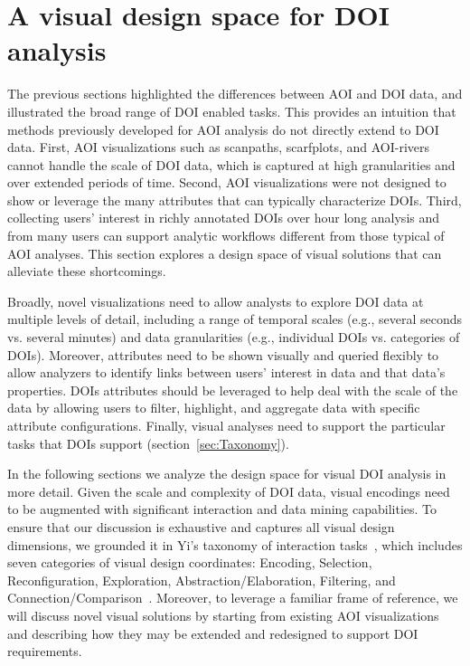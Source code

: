 \section{A visual design space for DOI analysis}
The previous sections highlighted the differences between AOI and DOI data, and illustrated the broad range of DOI enabled tasks. This provides an intuition that methods previously developed for AOI analysis do not directly extend to DOI data. First, AOI visualizations such as scanpaths, scarfplots, and AOI-rivers cannot handle the scale of DOI data, which is captured at high granularities and over extended periods of time. Second, AOI visualizations were not designed to show or leverage the many attributes that can typically characterize DOIs.  Third, collecting users' interest in richly annotated DOIs over hour long analysis and from many users can support analytic workflows different from those typical of AOI analyses. This section explores a design space of visual solutions that can alleviate these shortcomings.

Broadly, novel visualizations need to allow analysts to explore DOI data at multiple levels of detail, including a range of temporal scales (e.g., several seconds vs. several minutes) and data granularities (e.g., individual DOIs vs. categories of DOIs).  Moreover, attributes need to be shown visually and queried flexibly to allow analyzers to identify links between users' interest in data and that data's properties. DOIs attributes should be leveraged to help deal with the scale of the data by allowing users to filter, highlight, and aggregate data with specific attribute configurations. Finally, visual analyses need to support the particular tasks that DOIs support (section~\ref{sec:Taxonomy}). 

In the following sections we analyze the design space for visual DOI analysis in more detail. Given the scale and complexity of DOI data, visual encodings need to be augmented with significant interaction and data mining capabilities. To ensure that our discussion is exhaustive and captures all visual design dimensions, we grounded it in Yi's taxonomy of interaction tasks~\cite{yi2007toward}, which includes seven categories of visual design coordinates: Encoding, Selection, Reconfiguration, Exploration, Abstraction/Elaboration, Filtering, and Connection/Comparison~\cite{yi2007toward}. Moreover, to leverage a familiar frame of reference, we will discuss novel visual solutions by starting from existing AOI visualizations and describing how they may be extended and redesigned to support DOI requirements. 


